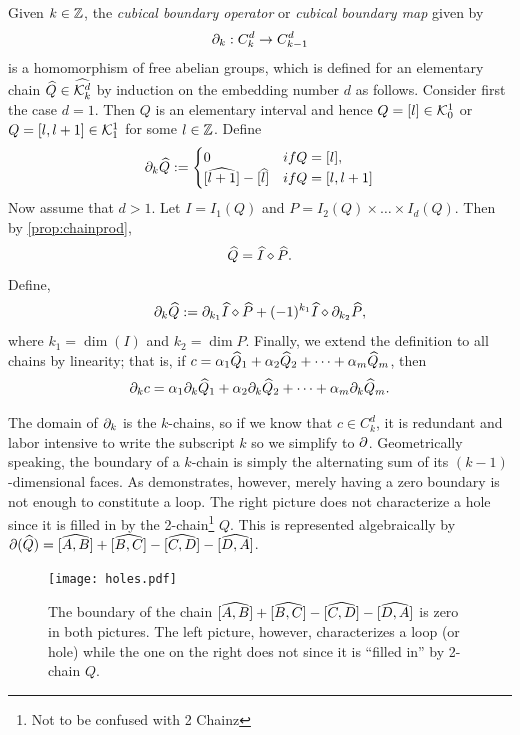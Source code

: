 \begin{defn} \label{defn:bdop}
	Given $k \in \mathbb{Z}$, the \textit{cubical boundary operator} or \textit{cubical boundary map} given by
	$$ \partial_k : C_k^d \rightarrow C_{k-1}^d $$
	is a homomorphism of free abelian groups, which is defined for an elementary chain $\widehat{Q} \in \widehat{\mathcal{K}^{d}_k}$ by induction on the embedding number $d$ as follows. Consider first the case $d = 1$. Then $Q$ is an elementary interval and hence $Q = [l] \in \mathcal{K}_0^1$ or $Q = [l, l+1] \in \mathcal{K}_1^1$ for some $l \in \mathbb{Z}$. Define
		$$ \del_k \Qhat :=
			\begin{cases}
				0	& if Q = [l], \\
				[ \wh{l+1} ] - [\wh{l}]	& if Q = [l, l+1]
			\end{cases}$$
	Now assume that $d > 1$. Let $I = I_1(Q)$ and $P = I_2(Q) \times \ldots \times I_d(Q)$. Then by \ref{prop:chainprod},
	$$ \widehat{Q} = \widehat{I} \diamond \widehat{P}. $$
	Define,
	$$\partial_k \widehat{Q} := \partial_{k_1} \widehat{I} \diamond \widehat{P} + (-1)^{k_1} \widehat{I} \diamond \partial_{k_2} \widehat{P}, $$
	where $k_1 = \dim(I)$ and $k_2 = \dim{P}$. Finally, we extend the definition to all chains by linearity; that is, if $c = \alpha_1 \widehat{Q}_1 + \alpha_2 \widehat{Q}_2 + \cdots + \alpha_m \widehat{Q}_m$, then
	$$ \partial_k c = \alpha_1 \partial_k \widehat{Q}_1 + \alpha_2 \partial_k \widehat{Q}_2 + \cdots + \alpha_m \partial_k \widehat{Q}_m. $$
\end{defn}

The domain of $\partial_k$ is the $k$-chains, so if we know that $c \in C_k^d$, it is redundant and labor intensive to write the subscript $k$ so we simplify to $\partial$. Geometrically speaking, the boundary of a $k$-chain is simply the alternating sum of its $(k-1)$-dimensional faces. As  demonstrates, however, merely having a zero boundary is not enough to constitute a loop. The right picture does not characterize a hole since it is filled in by the 2-chain\footnote{Not to be confused with 2 Chainz} $Q$. This is represented algebraically by $\partial (\widehat{Q}) = [\widehat{A, B}] + [\widehat{B, C}] - [\widehat{C, D}] - [\widehat{D, A}]$.

\begin{figure}[h]
\begin{center}
\texttt{[image: holes.pdf]}
\caption{\label{fig:holes} The boundary of the chain $[\widehat{A, B}] + [\widehat{B, C}] - [\widehat{C, D}] - [\widehat{D, A}]$ is zero in both pictures. The left picture, however, characterizes a loop (or hole) while the one on the right does not since it is ``filled in'' by 2-chain $Q$. }
\end{center}
\end{figure}

